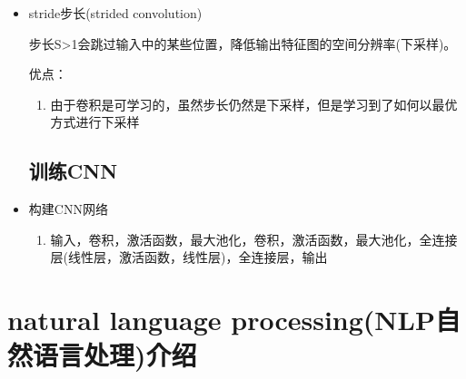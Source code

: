 \documentclass[UTF8]{ctexart}
\begin{document}
\begin{itemize}
\begin{enumerate}
        最大池化选择每个池化窗口的最大值并且保留窗口中的主要特征。
        \begin{itemize}
            \item 帮助卷积神经网络关注最重要的模式
            \item 让模型对噪声具有鲁棒性
        \end{itemize}
        \item AveragePooling平均池化
        
        平均池化选择每个池化窗口的平均值并且保持整体信息的平滑。
        \begin{itemize}
            \item 保留更多的背景信息
            \item 当提取图像中像素强度分布时有用
        \end{itemize}

        \item 池化缺点
        \begin{enumerate}
            \item 池化会损失一些信息，尤其是一些较弱但是重要的特征(边缘/角点)
            \item 池化是一种不可学习的操作。
        \end{enumerate}
    \end{enumerate}
    \item stride步长(strided convolution)
    
    步长S>1会跳过输入中的某些位置，降低输出特征图的空间分辨率(下采样)。

    优点：
    \begin{enumerate}
        \item 由于卷积是可学习的，虽然步长仍然是下采样，但是学习到了如何以最优方式进行下采样
    \end{enumerate}

\subsection{训练CNN}
    \item 构建CNN网络
    \begin{enumerate}
        \item 输入，卷积，激活函数，最大池化，卷积，激活函数，最大池化，全连接层(线性层，激活函数，线性层)，全连接层，输出
    \end{enumerate}
\end{itemize}

\section{natural language processing(NLP自然语言处理)介绍}
\end{document}
